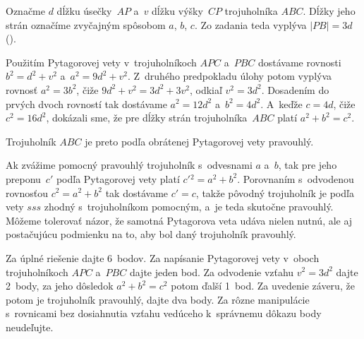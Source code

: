 {%
Označme $d$ dĺžku úsečky~$AP$ a~$v$ dĺžku výšky~$CP$ trojuholníka $ABC$.
Dĺžky jeho strán označíme zvyčajným spôsobom $a$, $b$, $c$.
Zo zadania teda vyplýva $|PB|=3d$ (\obr).
%

Použitím Pytagorovej vety v~trojuholníkoch $APC$ a~$PBC$ dostávame rovnosti
$b^2=d^2+v^2$ a~$a^2 = 9d^2+ v^2$.
Z~druhého predpokladu úlohy potom vyplýva rovnosť $a^2=3b^2$, čiže $9d^2+v^2=3d^2+3v^2$,
odkiaľ $v^2=3d^2$. Dosadením do prvých dvoch rovností tak dostávame
$a^2=12d^2$ a~$b^2=4d^2$.
A~keďže $c=4d$, čiže $c^2=16d^2$, dokázali sme, že pre dĺžky strán
trojuholníka~$ABC$ platí $a^2+b^2=c^2$.

Trojuholník $ABC$ je preto podľa obrátenej Pytagorovej vety pravouhlý.

\poznamka
Ak zvážime pomocný pravouhlý trojuholník s~odvesnami $a$ a~$b$, tak pre jeho preponu~$c'$
podľa Pytagorovej vety platí $c'{}^2=a^2+b^2$. Porovnaním s~odvodenou rovnosťou
$c^2=a^2+b^2$ tak dostávame $c'=c$, takže pôvodný trojuholník je podľa vety $sss$
zhodný s~trojuholníkom pomocným, a~je teda skutočne pravouhlý.
Môžeme tolerovať názor, že samotná Pytagorova veta udáva nielen
nutnú, ale aj postačujúcu podmienku na to, aby bol daný trojuholník pravouhlý.

\nobreak\medskip\petit\noindent
Za úplné riešenie dajte 6~bodov. Za napísanie Pytagorovej vety v~oboch
trojuholníkoch $APC$ a~$PBC$ dajte jeden bod.
Za odvodenie vzťahu $v^2=3d^2$ dajte 2~body, za jeho dôsledok $a^2+b^2=c^2$ potom ďalší 1~bod.
Za uvedenie záveru, že potom
je trojuholník pravouhlý, dajte dva body.
Za rôzne manipulácie s~rovnicami bez dosiahnutia vzťahu vedúceho k~správnemu
dôkazu body neudeľujte.

\endpetit
}

